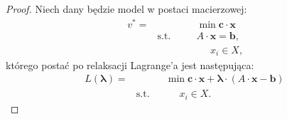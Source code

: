 \begin{proof}
	Niech dany będzie model w postaci macierzowej:
	\begin{subequations}
		\begin{alignat}{4}
		v^{\ast} = & & & \min \textbf{c} \cdot \textbf{x} \\
		& \text{s.t.} & \quad & A \cdot \textbf{x} = \textbf{b},\\
		& & & \phantom{\sum} x_{i} \in X\text{,}
		\end{alignat}\label{mod:relax1}
	\end{subequations}
	którego postać po relaksacji Lagrange'a jest następująca:
	\begin{subequations}
		\begin{alignat}{4}
		L \left( \boldsymbol{\lambda} \right) = & & & \min \textbf{c} \cdot \textbf{x} + \boldsymbol{\lambda} \cdot \left( A \cdot \textbf{x} - \textbf{b} \right) \\
		& \text{s.t.} & & \phantom{\sum} x_{i} \in X\text{.}
		\end{alignat}\label{mod:relax2}
	\end{subequations}
	

\end{proof}
